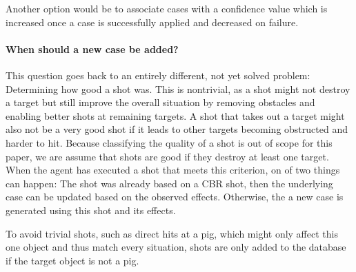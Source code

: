 Another option would be to associate cases with a confidence value which is increased once a case is successfully applied and decreased on failure.

\paragraph{When should a new case be added?}
This question goes back to an entirely different, not yet solved problem: Determining how good a shot was.
This is nontrivial, as a shot might not destroy a target but still improve the overall situation by removing obstacles and enabling better shots at remaining targets.
A shot that takes out a target might also not be a very good shot if it leads to other targets becoming obstructed and harder to hit.
Because classifying the quality of a shot is out of scope for this paper, we are assume that shots are good if they destroy at least one target.
When the agent has executed a shot that meets this criterion, on of two things can happen: The shot was already based on a CBR shot, then the underlying case can be updated based on the observed effects. Otherwise, the a new case is generated using this shot and its effects.

To avoid trivial shots, such as direct hits at a pig, which might only affect this one object and thus match every situation, shots are only added to the database if the target object is not a pig.